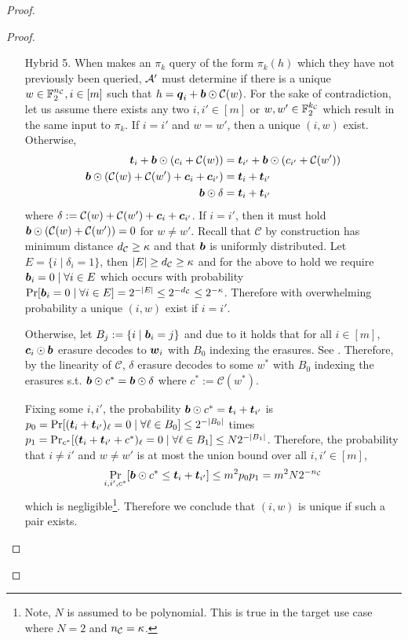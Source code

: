 \begin{proof}
\begin{proof}
\begin{enumerate}[leftmargin=1.8cm]
			\item[Hybrid 5.] \label{hybrid:simOutput2R} When \send makes an $\pi_k$ query of the form $\pi_k(h)$ which they have not previously been queried, $\Adv'$ must determine if there is a unique $w\in\mathbb{F}^\nc_2,i\in[m]$ such that $h=\qq_i+\bb\odot \mathcal{C}(w)$. For the sake of contradiction, let us assume there exists any two $i,i'\in[m]$ or  $w,w'\in\mathbb{F}^\kc_2$ which result in the same input to $\pi_k$. If $i=i'$ and $w=w'$, then a unique $(i,w)$ exist. Otherwise,
			\begin{align*}
			\tt_i + \bb \odot (c_i + \mathcal{C}(w)) &= \tt_{i'} +\bb \odot (c_{i'} + \mathcal{C}(w'))\\
			\bb \odot (\mathcal{C}(w) + \mathcal{C}(w') + \cc_i +\cc_{i'})  &= \tt_{i} +\tt_{i'}  \\
			\bb\odot\delta&=\tt_i+\tt_{i'}			
			\end{align*}			
			where $\delta:=\mathcal{C}(w) + \mathcal{C}(w')+\cc_i+\cc_{i'}$. If $i=i'$, then it must hold $\bb \odot (\mathcal{C}(w) + \mathcal{C}(w'))=0$ for $w\neq w'$.  Recall that $\mathcal{C}$ by construction has minimum distance $\dc\geq\kappa$ and that $\bb$ is uniformly distributed. Let $E=\{i \mid \delta_i=1\}$, then $|E|\geq \dc\geq \kappa$ and for the above to hold we require $\bb_i=0 \mid \forall i\in E$ which occurs with probability $\Pr[\bb_i=0 \mid \forall i\in E]=2^{-|E|}\leq 2^{-\dc}\leq2^{-\kappa}$.  Therefore with overwhelming probability a unique $(i,w)$ exist if $i=i'$. 
			
			Otherwise, let  $B_j:=\{i \mid \bb_i=j\}$ and due to   it holds that for all $i\in[m]$, $\cc_i\odot\bb$ erasure decodes to $\ww_i$ with $B_0$ indexing the erasures. See . Therefore, by the linearity of $\mathcal{C}$, $\delta$ erasure decodes to some $w^*$ with $B_0$ indexing the erasures s.t. $\bb \odot c^*=\bb\odot \delta$ where $c^*:= \mathcal{C}(w^*)$. 
			
			
			Fixing some $i,i'$, the probability $\bb\odot c^* = \tt_{i} +\tt_{i'}$  is $p_0=\Pr[(\tt_{i} +\tt_{i'})_{\ell}=0 \mid \forall\ell \in B_0]\leq 2^{-|B_0|}$ times $p_1=\Pr_{c^*}[(\tt_{i} +\tt_{i'}+c^*)_\ell = 0 \mid \forall \ell \in B_1]\leq N2^{-|B_1|}$. Therefore, the probability that $i\neq i'$ and $w\neq w'$ is at most the union bound over all $i,i'\in[m]$,
			\begin{equation}\label{eq:unique}
				\Pr_{i,i',c^*}[\bb\odot c^* \leq \tt_{i} +\tt_{i'}]\leq m^2p_0p_1=m^2N2^{-\nc}
			\end{equation}
			which is negligible\footnote{Note, $N$ is assumed to be polynomial. This is true in the target use case where $N=2$ and $\nc=\kappa$. }.  Therefore we conclude that $(i,w)$ is unique if such a pair exists.
			

\end{enumerate}
\end{proof}
\end{proof}
